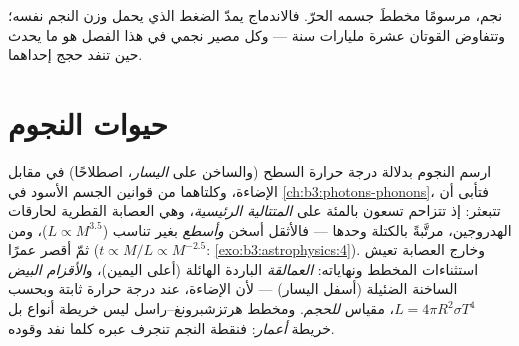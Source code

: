 \begin{omfigure}

{\small نجم، مرسومًا مخططَ جسمه الحرّ. فالاندماج يمدّ
الضغط الذي يحمل وزن النجم نفسه؛ وتتفاوض القوتان
عشرة مليارات سنة --- وكل مصير نجمي في هذا
الفصل هو ما يحدث حين تنفد حجج إحداهما.}
\end{omfigure}

\section{حيوات النجوم}

\begin{definition}\label{def:b3:astrophysics:hr}
ارسم النجوم بدلالة درجة حرارة السطح (والساخن على \emph{اليسار}،
اصطلاحًا) في مقابل الإضاءة، وكلتاهما من قوانين الجسم الأسود في
\cref{ch:b3:photons-phonons}، فتأبى أن
تتبعثر: إذ تتزاحم تسعون بالمئة على \emph{المتتالية الرئيسية}، وهي
العصابة القطرية لحارقات الهدروجين، مرتَّبةً بالكتلة وحدها ---
فالأثقل أسخن \emph{وأسطع} بغير تناسب
($L \propto M^{3.5}$)، ومن ثمّ أقصر عمرًا
($t \propto M/L \propto M^{-2.5}$:
\cref{exo:b3:astrophysics:4}). وخارج العصابة تعيش
استثناءات المخطط ونهاياته: \emph{العمالقة} الباردة الهائلة
(أعلى اليمين)، و\emph{الأقزام البيض} الساخنة الضئيلة (أسفل اليسار)
--- لأن الإضاءة، عند درجة حرارة ثابتة وبحسب $L = 4\pi R^2\sigma T^4$،
مقياس \emph{للحجم}. ومخطط هرتزشبرونغ--راسل ليس
خريطة أنواع بل خريطة \emph{أعمار}: فنقطة النجم تنجرف عبره كلما
نفد وقوده.
\end{definition}

